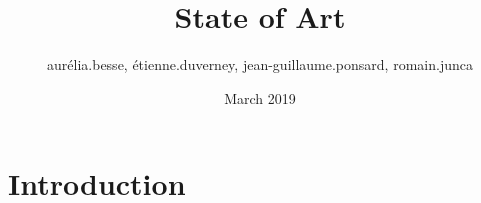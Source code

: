 \documentclass{article}
\title{State of Art}
\author{ aurélia.besse, étienne.duverney, jean-guillaume.ponsard, romain.junca }
\date{March 2019}
\begin{document}
\maketitle

\section{Introduction}
\end{document}
